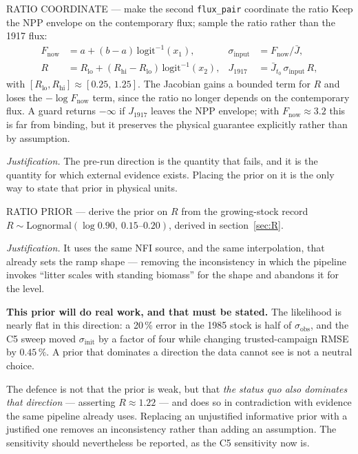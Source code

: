 \documentclass[11pt]{article}
\newcommand{\sinit}{\sigma_{\mathrm{init}}}
\newcommand{\sinput}{\sigma_{\mathrm{input}}}
\newcommand{\sobs}{\sigma_{\mathrm{obs}}}
\newcommand{\Jto}{\bar{J}_{t_0}}
\begin{document}
\begin{proposal}{RATIO COORDINATE --- make the second \texttt{flux\_pair} coordinate the ratio}
Keep the NPP envelope on the contemporary flux; sample the ratio rather than the 1917 flux:
\begin{align*}
F_{\mathrm{now}} &= a + (b-a)\,\mathrm{logit}^{-1}(x_1), & \sinput &= F_{\mathrm{now}}/\bar{J},\\
R &= R_{\mathrm{lo}} + (R_{\mathrm{hi}}-R_{\mathrm{lo}})\,\mathrm{logit}^{-1}(x_2), &
J_{1917} &= \Jto\,\sinput\,R,
\end{align*}
with $[R_{\mathrm{lo}}, R_{\mathrm{hi}}] \approx [0.25,\,1.25]$. The Jacobian gains a bounded
term for $R$ and loses the $-\log F_{\mathrm{now}}$ term, since the ratio no longer depends on
the contemporary flux. A guard returns $-\infty$ if $J_{1917}$ leaves the NPP envelope; with
$F_{\mathrm{now}} \approx 3.2$ this is far from binding, but it preserves the physical
guarantee explicitly rather than by assumption.

\smallskip
\emph{Justification.} The pre-run direction is the quantity that fails, and it is the quantity
for which external evidence exists. Placing the prior on it is the only way to state that prior
in physical units.
\end{proposal}

\begin{proposal}{RATIO PRIOR --- derive the prior on $R$ from the growing-stock record}
$R \sim \mathrm{Lognormal}(\log 0.90,\ 0.15\text{--}0.20)$, derived in section~\ref{sec:R}.

\smallskip
\emph{Justification.} It uses the same NFI source, and the same interpolation, that already
sets the ramp shape --- removing the inconsistency in which the pipeline invokes ``litter scales
with standing biomass'' for the shape and abandons it for the level.
\end{proposal}

\begin{caveat}
\textbf{This prior will do real work, and that must be stated.} The likelihood is nearly flat in
this direction: a 20\,\% error in the 1985 stock is half of $\sobs$, and the C5 sweep moved
$\sinit$ by a factor of four while changing trusted-campaign RMSE by $0.45\,\%$. A prior that
dominates a direction the data cannot see is not a neutral choice.

The defence is not that the prior is weak, but that \emph{the status quo also dominates that
direction} --- asserting $R \approx 1.22$ --- and does so in contradiction with evidence the
same pipeline already uses. Replacing an unjustified informative prior with a justified one
removes an inconsistency rather than adding an assumption. The sensitivity should nevertheless
be reported, as the C5 sensitivity now is.
\end{caveat}
\end{document}
